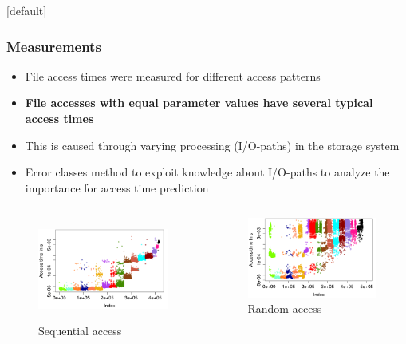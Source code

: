 \documentclass{beamer}
\makeatletter
\newenvironment{withoutheadline}{
	\setbeamertemplate{headline}[default]
	\def\beamer@entrycode{\vspace*{-\headheight}}
}{}
\makeatother
\begin{document}
\begin{withoutheadline}
	\begin{frame}
		\frametitle{Measurements}
		\begin{itemize}
			\item File access times were measured for different access patterns
			\item \textbf{File accesses with equal parameter values have several typical access times}
			\item This is caused through varying processing (I/O-paths) in the storage system
			\item Error classes method to exploit knowledge about I/O-paths to analyze the importance for access time prediction
		\end{itemize}
		\begin{columns}
			\begin{figure}
				\includegraphics[width=1\linewidth]{Bilder/plot_SizeSorted_log_read_seq.png}\\
				\caption{Sequential access}
			\end{figure}
			\begin{figure}
				\includegraphics[width=1\linewidth]{Bilder/plot_SizeSorted_log_read_rnd.png}
				\caption{Random access}	
		\end{figure}
		\end{columns}
	\end{frame}
\end{withoutheadline}
\end{document}
